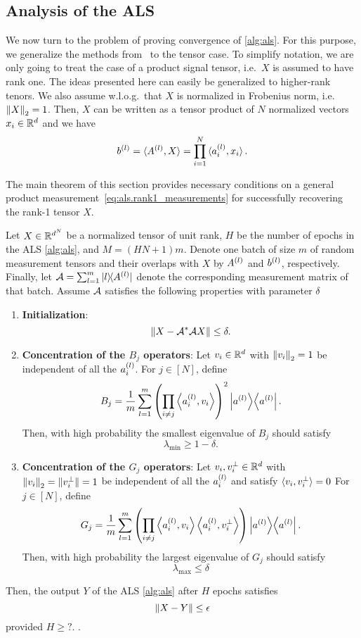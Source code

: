 \subsection{Analysis of the ALS}%
\label{sub:ana}

We now turn to the problem of proving convergence of \cref{alg:als}.
For this purpose, we generalize the methods from~\cite{Zhong} to the tensor case.
To simplify notation, we are only going to treat the case of a product signal tensor, i.e.\ $X$ is assumed to have rank one.
The ideas presented here can easily be generalized to higher-rank tenors.
We also assume w.l.o.g.\ that $X$ is normalized in Frobenius norm, i.e.\ $\norm{X}_2 = 1$.
Then, $X$ can be written as a tensor product of $N$ normalized vectors $x_i \in \Reals^d$ and we have
\[
  b\ind{l} = \braket{A\ind{l}, X} = \prod_{i=1}^N \braket{a\ind{l}_i, x_i}.
  \label{eq:ana.b_as_product}
\]

The main theorem of this section provides necessary conditions on a general product measurement~\eqref{eq:als.rank1_measurements} for successfully recovering the rank-1 tensor $X$.
\begin{theorem}%
  \label{thm:ana.conditions}
  Let $X \in \Reals^{d^N}$ be a normalized tensor of unit rank, $H$ be the number of epochs in the ALS \cref{alg:als}, and $M = (HN + 1)m$.
  Denote one batch of size $m$ of random measurement tensors and their overlaps with $X$ by $A\ind{l}$ and $b\ind{l}$, respectively.
  Finally, let $\AA = \sum_{l=1}^m \ket{l}\bra{A\ind{l}}$ denote the corresponding measurement matrix of that batch.
  Assume $\AA$ satisfies the following properties with parameter $\delta$
  \begin{enumerate}
    \item\label{lbl:conditions.init}\textbf{Initialization}:
      \[
        \Norm{X - \adj{\AA}\AA X} \le \delta.
      \]
    \item\label{lbl:conditions.B}\textbf{Concentration of the $B_j$ operators}:
      Let $v_i \in \Reals^d$ with $\norm{v_i}_2 = 1$ be independent of all the $a\ind{l}_i$.
      For $j \in [N]$, define
      \[
        B_j = \frac{1}{m} \sum_{l=1}^m \left( \prod_{i\neq j} \Braket{a\ind{l}_i, v_i} \right)^2 \Ketbra{a\ind{l}}.
      \]
      Then, with high probability the smallest eigenvalue of $B_j$ should satisfy
      \[
        \lambda_\mathrm{min} \ge 1 - \delta.
      \]
    \item\label{lbl:conditions.G}\textbf{Concentration of the $G_j$ operators}:
      Let $v_i, v_i^\perp \in \Reals^d$ with $\norm{v_i}_2 = \norm{v_i^\perp}= 1$ be independent of all the $a\ind{l}_i$ and satisfy $\braket{v_i, v_i^\perp} = 0$
      For $j \in [N]$, define
      \[
        G_j = \frac{1}{m} \sum_{l=1}^m \left( \prod_{i\neq j} \Braket{a\ind{l}_i, v_i} \Braket{a\ind{l}_i, v_i^\perp} \right) \Ketbra{a\ind{l}}.
      \]
      Then, with high probability the largest eigenvalue of $G_j$ should satisfy
      \[
        \lambda_\mathrm{max} \le \delta
      \]
  \end{enumerate}
  Then, the output $Y$ of the ALS \cref{alg:als} after $H$ epochs satisfies
  \[
    \norm{X - Y} \le \epsilon
  \]
  provided $H \ge ?$.
  .
\end{theorem}

